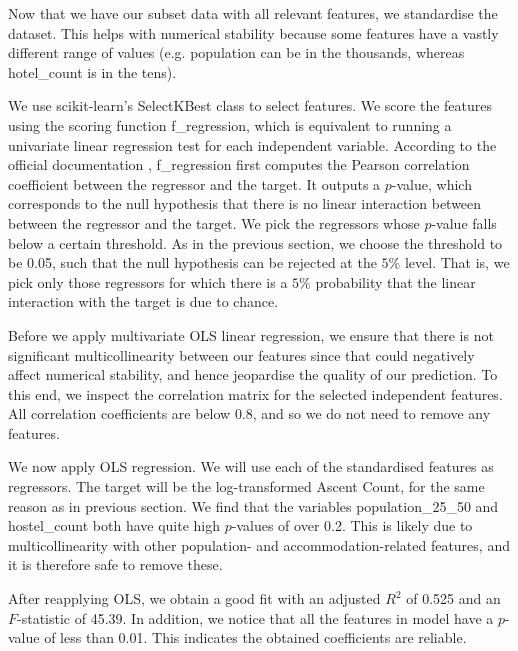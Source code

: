 \documentclass[11pt,a4paper]{article}
\begin{document}
Now that we have our subset data with all relevant features, we standardise the dataset. This helps with numerical stability because some features have a vastly different range of values (e.g. population can be in the thousands, whereas hotel\_count is in the tens).

We use scikit-learn's SelectKBest class to select features. We score the features using the scoring function f\_regression, which is equivalent to running a univariate linear regression test for each independent variable. According to the official documentation \cite{scikit-learn}, f\_regression first computes the Pearson correlation coefficient between the regressor and the target. It outputs a $p$-value, which corresponds to the null hypothesis that there is no linear interaction between between the regressor and the target. We pick the regressors whose $p$-value falls below a certain threshold. As in the previous section, we choose the threshold to be 0.05, such that the null hypothesis can be rejected at the $5\%$ level. That is, we pick only those regressors for which there is a $5\%$ probability that the linear interaction with the target is due to chance.

Before we apply multivariate OLS linear regression, we ensure that there is not significant multicollinearity between our features since that could negatively affect numerical stability, and hence jeopardise the quality of our prediction. To this end, we inspect the correlation matrix for the selected independent features. All correlation coefficients are below 0.8, and so we do not need to remove any features.

We now apply OLS regression. We will use each of the standardised features as regressors. The target will be the log-transformed Ascent Count, for the same reason as in previous section. We find that the variables population\_25\_50 and hostel\_count both have quite high $p$-values of over 0.2. This is likely due to multicollinearity with other population- and accommodation-related features, and it is therefore safe to remove these.

After reapplying OLS, we obtain a good fit with an adjusted $R^{2}$ of 0.525 and an $F$-statistic of 45.39. In addition, we notice that all the features in model have a $p$-value of less than 0.01. This indicates the obtained coefficients are reliable.
\end{document}
